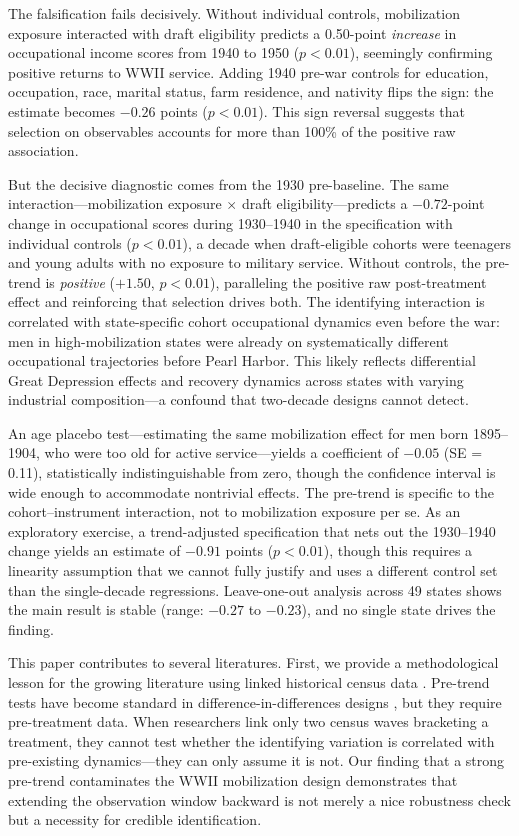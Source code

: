 \documentclass[12pt]{article}
\begin{document}
The falsification fails decisively. Without individual controls, mobilization exposure interacted with draft eligibility predicts a 0.50-point \textit{increase} in occupational income scores from 1940 to 1950 ($p < 0.01$), seemingly confirming positive returns to WWII service. Adding 1940 pre-war controls for education, occupation, race, marital status, farm residence, and nativity flips the sign: the estimate becomes $-0.26$ points ($p < 0.01$). This sign reversal suggests that selection on observables accounts for more than 100\% of the positive raw association.

But the decisive diagnostic comes from the 1930 pre-baseline. The same interaction---mobilization exposure $\times$ draft eligibility---predicts a $-0.72$-point change in occupational scores during 1930--1940 in the specification with individual controls ($p < 0.01$), a decade when draft-eligible cohorts were teenagers and young adults with no exposure to military service. Without controls, the pre-trend is \textit{positive} ($+1.50$, $p < 0.01$), paralleling the positive raw post-treatment effect and reinforcing that selection drives both. The identifying interaction is correlated with state-specific cohort occupational dynamics even before the war: men in high-mobilization states were already on systematically different occupational trajectories before Pearl Harbor. This likely reflects differential Great Depression effects and recovery dynamics across states with varying industrial composition---a confound that two-decade designs cannot detect.

An age placebo test---estimating the same mobilization effect for men born 1895--1904, who were too old for active service---yields a coefficient of $-0.05$ (SE = 0.11), statistically indistinguishable from zero, though the confidence interval is wide enough to accommodate nontrivial effects. The pre-trend is specific to the cohort--instrument interaction, not to mobilization exposure per se. As an exploratory exercise, a trend-adjusted specification that nets out the 1930--1940 change yields an estimate of $-0.91$ points ($p < 0.01$), though this requires a linearity assumption that we cannot fully justify and uses a different control set than the single-decade regressions. Leave-one-out analysis across 49 states shows the main result is stable (range: $-0.27$ to $-0.23$), and no single state drives the finding.

This paper contributes to several literatures. First, we provide a methodological lesson for the growing literature using linked historical census data \citep{abramitzky2012, abramitzky2021, bailey2022, long2009, ward2023, feigenbaum2016}. Pre-trend tests have become standard in difference-in-differences designs \citep{roth2023, rambachan2023}, but they require pre-treatment data. When researchers link only two census waves bracketing a treatment, they cannot test whether the identifying variation is correlated with pre-existing dynamics---they can only assume it is not. Our finding that a strong pre-trend contaminates the WWII mobilization design demonstrates that extending the observation window backward is not merely a nice robustness check but a necessity for credible identification.
\end{document}
